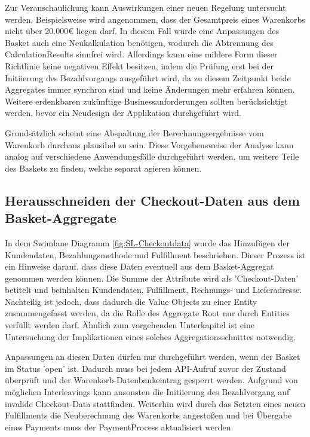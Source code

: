 Zur Veranschaulichung kann Auswirkungen einer neuen Regelung untersucht werden. Beispielsweise wird angenommen, dass der Gesamtpreis eines Warenkorbs nicht über 20.000€ liegen darf. In diesem Fall würde eine Anpassungen des Basket auch eine Neukalkulation benötigen, wodurch die Abtrennung des CalculationResults sinnfrei wird. Allerdings kann eine mildere Form dieser Richtlinie keine negativen Effekt besitzen, indem die Prüfung erst bei der Initiierung des Bezahlvorgangs ausgeführt wird, da zu diesem Zeitpunkt beide Aggregates immer synchron sind und keine Änderungen mehr erfahren können. Weitere erdenkbaren zukünftige Businessanforderungen sollten berücksichtigt werden, bevor ein Neudesign der Applikation durchgeführt wird.

Grundsätzlich scheint eine Abspaltung der Berechnungsergebnisse vom Warenkorb durchaus plausibel zu sein. Diese Vorgehensweise der Analyse kann analog auf verschiedene Anwendungsfälle durchgeführt werden, um weitere Teile des Baskets zu finden, welche separat agieren können. 

\subsection{Herausschneiden der Checkout-Daten aus dem Basket-Aggregate}

In dem Swimlane Diagramm \ref{fig:SL-Checkoutdata} wurde das Hinzufügen der Kundendaten, Bezahlungsmethode und Fulfillment beschrieben. Dieser Prozess ist ein Hinweise darauf, dass diese Daten eventuell aus dem Basket-Aggregat genommen werden können. Die Summe der Attribute wird als 'Checkout-Daten' betitelt und beinhalten Kundendaten, Fulfillment, Rechnungs- und Lieferadresse. Nachteilig ist jedoch, dass dadurch die Value Objects zu einer Entity zusammengefasst werden, da die Rolle des Aggregate Root nur durch Entities verfüllt werden darf. Ähnlich zum vorgehenden Unterkapitel ist eine Untersuchung der Implikationen eines solches Aggregationsschnittes notwendig.

Anpassungen an diesen Daten dürfen nur durchgeführt werden, wenn der Basket im Status 'open' ist. Dadurch muss bei jedem API-Aufruf zuvor der Zustand überprüft und der Warenkorb-Datenbankeintrag gesperrt werden. Aufgrund von möglichen Interleavings kann ansonsten die Initiierung des Bezahlvorgang auf invalide Checkout-Data stattfinden. Weiterhin wird durch das Setzten eines neuen Fulfillments die Neuberechnung des Warenkorbs angestoßen und bei Übergabe eines Payments muss der PaymentProcess aktualisiert werden.

